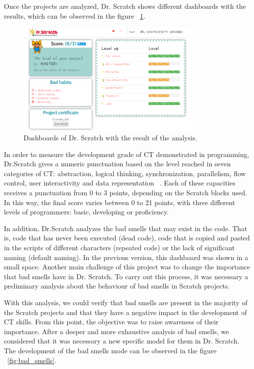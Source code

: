 Once the projects are analyzed, Dr. Scratch shows different dashboards with the results, which can be observed in the figure ~\ref{fig:dashboards}.

\begin{figure}[h]
  \centering
  \includegraphics[width=9cm, keepaspectratio]{img/dashboards.png}
  \caption{Dashboards of Dr. Scratch with the result of the analysis.}
  \label{fig:dashboards}
\end{figure}

In order to measure the development grade of CT demonstrated in programming, Dr.Scratch gives a numeric punctuation based on the level reached in seven categories of CT: abstraction, logical thinking, synchronization, parallelism, flow control, user interactivity and data representation ~\cite{jesus:_drscratch}. Each of these capacities receives a punctuation from 0 to 3 points, depending on the Scratch blocks used. In this way, the final score varies between 0 to 21 points, with three different levels of programmers: basic, developing or proficiency.   

In addition, Dr.Scratch analyzes the bad smells that may exist in the code. That is, code that has never been executed (dead code), code that is copied and pasted in the scripts of different characters (repeated code) or the lack of significant naming (default naming). In the previous version, this dashboard was shown in a small space. Another main challenge of this project was to change the importance that bad smells have in Dr. Scratch. To carry out this process, it was necessary a preliminary analysis about the behaviour of bad smells in Scratch projects.

With this analysis, we could verify that bad smells are present in the majority of the Scratch projects and that they have a negative impact in the development of CT skills. From this point, the objective was to raise awareness of their importance. After a deeper and more exhaustive analysis of bad smells, we considered that it was necessary a new specific model for them in Dr. Scratch. The development of the bad smells mode can be observed in the figure ~\ref{fig:bad_smells}.

